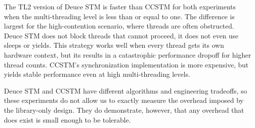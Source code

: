 The TL2 version of Deuce STM is faster than CCSTM for both experiments when
the multi-threading level is less than or equal to one.  The difference
is largest for the high-contention scenario, where threads are often
obstructed.  Deuce STM does not block threads that cannot proceed, it
does not even use sleeps or yields.  This strategy works well when every
thread gets its own hardware context, but its results in a catastrophic
performance dropoff for higher thread counts.  CCSTM's synchronization
implementation is more expensive, but yields stable performance even at
high multi-threading levels.

Deuce STM and CCSTM have different algorithms and engineering tradeoffs,
so these experiments do not allow us to exactly measure the overhead
imposed by the library-only design.  They do demonstrate, however,
that any overhead that does exist is small enough to be tolerable.
